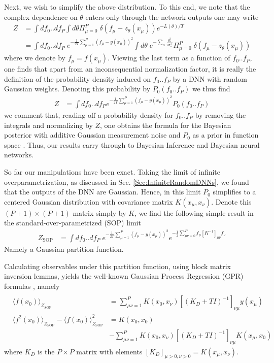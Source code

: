 Next, we wish to simplify the above distribution. To this end, we note that the complex dependence on $\theta$ enters only through the network outputs one may write 
\begin{align}
\label{Eq:Derivation1}
Z &= \int df_0..df_P \int d\theta \Pi_{\mu=0}^P \; \delta(f_{\mu}-z_{\theta}(x_{\mu}))  e^{-L(\theta)/T} \\ \nonumber 
&= \int df_0..df_P \; e^{-\frac{1}{2T} \sum_{\mu=1}^P (f_{\mu}-y(x_{\mu}))^2}\int d\theta \; e^{-\sum_{\alpha} \frac{\theta^2_{\alpha}}{2\sigma^2_{\alpha}}} \Pi_{\mu=0}^P \; \delta(f_{\mu}-z_{\theta}(x_{\mu}))  
\end{align}
where we denote by $f_\mu = f(x_\mu)$. Viewing the last term as a function of $f_0..f_P$, one finds that apart from an inconsequential normalization factor, it is really the definition of the probability density induced on $f_0..f_P$ by a DNN with random Gaussian weights. Denoting this probability by $P_0(f_0..f_P)$ we thus find 
\begin{align}
Z &= \int df_0..df_P e^{-\frac{1}{2T} \sum_{\mu=1}^P (f_{\mu}-y(x_{\mu}))^2} P_0(f_0..f_P)
\end{align}
we comment that, reading off a probability density for $f_0..f_P$ by removing the integrals and normalizing by $Z$, one obtains the formula for the Bayesian posterior with additive Gaussian measurement noise and $P_0$ as a prior in function space  \citep{Welling2011,cohen2021learning}. Thus, our results carry through to Bayesian Inference and Bayesian neural networks.

So far our manipulations have been exact. Taking the limit of infinite overparametrization, as discussed in Sec. \ref{Sec:InfiniteRandomDNNs}, we found that the outputs of the DNN are Gaussian. Hence, in this limit $P_0$ simplifies to a centered Gaussian distribution with covariance matrix $K(x_{\mu},x_{\nu})$. Denote this $(P+1) \times (P+1)$ matrix simply by $K$, we find the following simple result in the standard-over-parametrized (SOP) limit 
\begin{align}\label{eq:S_SOP}
Z_{\text{SOP}} &= \int df_0..df_P \; e^{-\frac{1}{2T} \sum_{\mu=1}^P (f_{\mu}-y(x_{\mu}))^2} e^{-\frac{1}{2} \sum_{\mu \nu=0}^P f_{\mu} [K^{-1}]_{\mu \nu} f_{\nu}}
\end{align}
Namely a Gaussian partition function. 

Calculating observables under this partition function, using block matrix inversion lemmas, yields the well-known Gaussian Process Regression (GPR) formulas \citep{Rasmussen2005},  namely 
\begin{eqnarray}
\label{Eq:GPR} \\ \nonumber
&\langle f(x_0) \rangle_{Z_{\text{SOP}}} &= \sum_{\mu \nu=1}^P K(x_0,x_{\nu}) [(K_D+TI)^{-1}]_{\nu \mu} y(x_{\mu}) \\ \nonumber 
&\langle f^2(x_0) \rangle_{Z_{\text{SOP}}} - \langle f(x_0) \rangle^2_{Z_{\text{SOP}}} &= K(x_0,x_0) \\ \nonumber
& & - \sum_{\mu \nu=1}^P K(x_0,x_{\nu}) [(K_D+T I)^{-1}]_{\nu \mu} K(x_{\mu},x_0) 
\end{eqnarray}
where $K_D$ is the $P \times P$ matrix with elements $[K_D]_{\mu>0,\nu>0}=K(x_{\mu},x_{\nu})$. 

